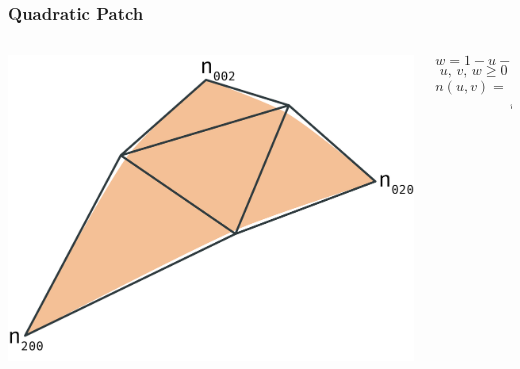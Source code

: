 \begin{frame}
	\frametitle{Quadratic Patch}
	\begin{columns}
		\begin{column}{0.5\textwidth}
			\includegraphics[width=\textwidth]{img/1_single/quadraticPatch.png}
		\end{column}
		\begin{column}{0.5\textwidth}
			\begin{equation*}
				w = 1 - u - v
			\end{equation*}
			\begin{equation*}
				u,\, v,\, w \geq 0
			\end{equation*}
			\begin{equation*}
				n(u,v) = \sum\limits_{i+j+k=2} n_{ijk} u^i v^j w^k
			\end{equation*}
		\end{column}		
	\end{columns}
\end{frame}